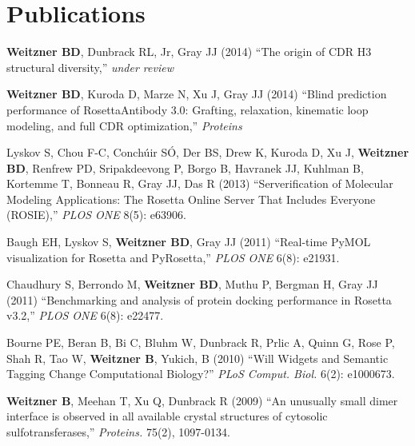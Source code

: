 \documentclass[12pt]{scrartcl}
\begin{document}
\section{\lsstyle Publications}
\noindent \textbf{Weitzner BD}, Dunbrack RL, Jr, Gray JJ (2014) ``The origin of CDR H3 structural diversity,'' \textit{under review} 

\noindent \textbf{Weitzner BD}, Kuroda D, Marze N, Xu J, Gray JJ (2014) ``Blind prediction performance of RosettaAntibody 3.0: Grafting, relaxation, kinematic loop modeling, and full CDR optimization,'' \textit{Proteins} 

\vspace{0.75\baselineskip}

\noindent Lyskov S, Chou F-C, Conch{\'u}ir S{\'O}, Der BS, Drew K, Kuroda D, Xu J, \textbf{Weitzner BD}, Renfrew PD, Sripakdeevong P, Borgo B, Havranek JJ, Kuhlman B, Kortemme T, Bonneau R, Gray JJ, Das R (2013) ``Serverification of Molecular Modeling Applications: The Rosetta Online Server That Includes Everyone (ROSIE),'' \textit{PLOS ONE} 8(5): e63906.

\vspace{0.75\baselineskip}

\noindent Baugh EH, Lyskov S, \textbf{Weitzner BD}, Gray JJ (2011) ``Real-time PyMOL visualization for Rosetta and PyRosetta,'' \textit{PLOS ONE} 6(8): e21931.

\vspace{0.75\baselineskip}

\noindent Chaudhury S, Berrondo M, \textbf{Weitzner BD}, Muthu P, Bergman H, Gray JJ (2011) ``Benchmarking and analysis of protein docking performance in Rosetta v3.2,'' \textit{PLOS ONE} 6(8): e22477.

\vspace{0.75\baselineskip}

\noindent Bourne PE, Beran B, Bi C, Bluhm W, Dunbrack R, Prlic A, Quinn G, Rose P, Shah R, Tao W, \textbf{Weitzner B}, Yukich, B (2010) ``Will Widgets and Semantic Tagging Change Computational Biology?'' \textit{PLoS Comput. Biol.} 6(2): e1000673.

\vspace{0.75\baselineskip}

\noindent\textbf{Weitzner B}, Meehan T, Xu Q, Dunbrack R (2009) ``An unusually small dimer interface is observed in all available crystal structures of cytosolic sulfotransferases,'' \textit{Proteins.} 75(2), 1097-0134.
\end{document}
